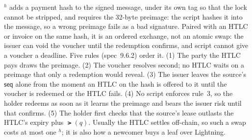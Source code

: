 $^{h}$ adds a payment hash to the signed message, under its
own tag so that the lock cannot be stripped, and requires the 32-byte
preimage: the script hashes it into the message, so a wrong preimage
fails as a bad signature. Paired with an HTLC or invoice on the same hash,
it is an ordered exchange, not an atomic swap: the issuer can void the
voucher until the redemption confirms, and script cannot give a voucher
a deadline. Five rules (spec~9.6.2) order it.
(1) The party the HTLC pays draws the preimage. (2) The voucher resolves
second; no HTLC waits on a preimage that only a redemption would reveal.
(3) The issuer leaves the source's $\mathsf{seq}$ alone from the moment
an HTLC on the hash is offered to it until the voucher is redeemed or
the HTLC fails. (4) No script enforces rule~3, so the holder redeems as
soon as it learns the preimage and bears the issuer risk until that
confirms. (5) The holder first checks that the source's lease outlasts
the HTLC's expiry plus $\lat(q)$. Usually the HTLC settles off-chain, so
such a swap costs at most one $^{h}$; it is also how a newcomer
buys a leaf over Lightning.
